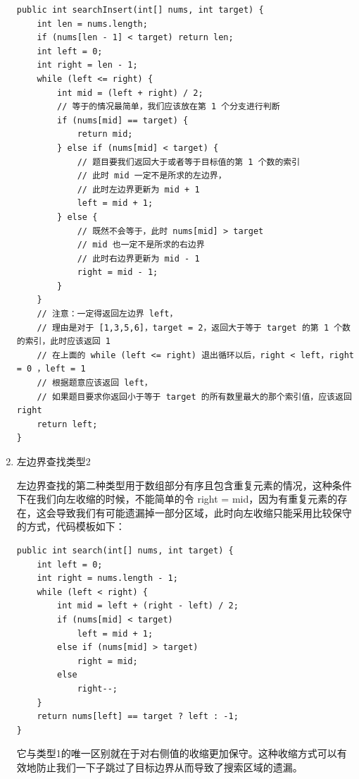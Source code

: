 \documentclass[9pt, b5paaper]{book}
\begin{document}
\begin{enumerate}
\begin{verbatim}
public int searchInsert(int[] nums, int target) {
    int len = nums.length;
    if (nums[len - 1] < target) return len;
    int left = 0;
    int right = len - 1;
    while (left <= right) {
        int mid = (left + right) / 2;
        // 等于的情况最简单，我们应该放在第 1 个分支进行判断
        if (nums[mid] == target) {
            return mid;
        } else if (nums[mid] < target) {
            // 题目要我们返回大于或者等于目标值的第 1 个数的索引
            // 此时 mid 一定不是所求的左边界，
            // 此时左边界更新为 mid + 1
            left = mid + 1;
        } else {
            // 既然不会等于，此时 nums[mid] > target
            // mid 也一定不是所求的右边界
            // 此时右边界更新为 mid - 1
            right = mid - 1;
        }
    }
    // 注意：一定得返回左边界 left，
    // 理由是对于 [1,3,5,6]，target = 2，返回大于等于 target 的第 1 个数的索引，此时应该返回 1
    // 在上面的 while (left <= right) 退出循环以后，right < left，right = 0 ，left = 1
    // 根据题意应该返回 left，
    // 如果题目要求你返回小于等于 target 的所有数里最大的那个索引值，应该返回 right
    return left;
}
\end{verbatim}
\item 左边界查找类型2
\label{sec-5-1-2-2}

左边界查找的第二种类型用于数组部分有序且包含重复元素的情况，这种条件下在我们向左收缩的时候，不能简单的令 right = mid，因为有重复元素的存在，这会导致我们有可能遗漏掉一部分区域，此时向左收缩只能采用比较保守的方式，代码模板如下：
\begin{verbatim}
public int search(int[] nums, int target) {
    int left = 0;
    int right = nums.length - 1;
    while (left < right) {
        int mid = left + (right - left) / 2;
        if (nums[mid] < target) 
            left = mid + 1;
        else if (nums[mid] > target) 
            right = mid;
        else 
            right--;
    }
    return nums[left] == target ? left : -1;
}
\end{verbatim}

它与类型1的唯一区别就在于对右侧值的收缩更加保守。这种收缩方式可以有效地防止我们一下子跳过了目标边界从而导致了搜索区域的遗漏。
\end{enumerate}
\end{document}
